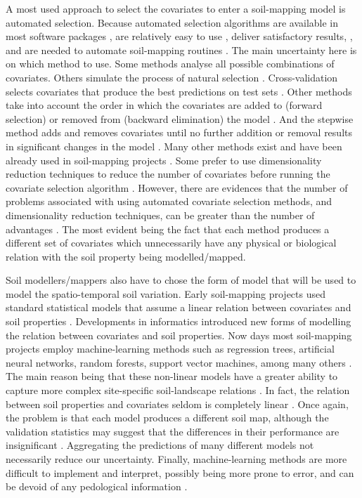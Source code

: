 A most used approach to select the covariates to enter a soil-mapping model is automated selection.
Because automated selection algorithms are available in most software packages \citep{Harrell2001}, 
are relatively easy to use \citep{DraperEtAl1971}, deliver satisfactory results, 
\citep{HenglEtAl2004}, and are needed to automate soil-mapping routines \citep{HenglEtAl2014}. The 
main uncertainty here is on which method to use. Some methods analyse all possible combinations of 
covariates. Others simulate the process of natural selection \citep{AndersenEtAl2010}. 
Cross-validation selects covariates that produce the best predictions on test sets 
\citep{GuyonEtAl2003}. Other methods take into account the order in which the covariates are added 
to (forward selection) or removed from (backward elimination) the model \citep{LarkEtAl2007a}. And 
the stepwise method adds and removes covariates until no further addition or removal results in 
significant changes in the model \citep{Efroymson1962}. Many other methods exist and have been 
already used in soil-mapping projects \citep{PoggioEtAl2013, NussbaumEtAl2014}. Some prefer to use 
dimensionality reduction techniques to reduce the number of covariates \citep{Massy1965} before 
running the covariate selection algorithm \citep{tenCatenEtAl2011a, HenglEtAl2014}. However, there 
are evidences that the number of problems associated with using automated covariate selection 
methods, and dimensionality reduction techniques, can be greater than the number of advantages 
\citep{FarrarEtAl1967, Jackson1993, Chatfield1995, Edirisooriya1995, Harrell2001, Jolliffe2002, 
PeresNetoEtAl2005, LarkEtAl2007a}. The most evident being the fact that each method produces a 
different set of covariates which unnecessarily have any physical or biological relation with the 
soil property being modelled/mapped.
 
Soil modellers/mappers also have to chose the form of model that will be used to model the 
spatio-temporal soil variation. Early soil-mapping projects used standard statistical models that 
assume a linear relation between covariates and soil properties \citep{MooreEtAl1993, OdehEtAl1994}.
Developments in informatics introduced new forms of modelling the relation between covariates and 
soil properties. Now days most soil-mapping projects employ machine-learning methods such as 
regression trees, artificial neural networks, random forests, support vector machines, among many 
others \citep{HeungEtAl2016}. The main reason being that these non-linear models have a greater 
ability to capture more complex site-specific soil-landscape relations \citep{Grunwald2009}. In 
fact, the relation between soil properties and covariates seldom is completely linear 
\citep{McKenzieEtAl2000}. Once again, the problem is that each model produces a different soil map, 
although the validation statistics may suggest that the differences in their performance are 
insignificant \citep{HeungEtAl2016}. Aggregating the predictions of many different models not 
necessarily reduce our uncertainty. Finally, machine-learning methods are more difficult to 
implement and interpret, possibly being more prone to error, and can be devoid of any pedological 
information \citep{Grunwald2009}.

